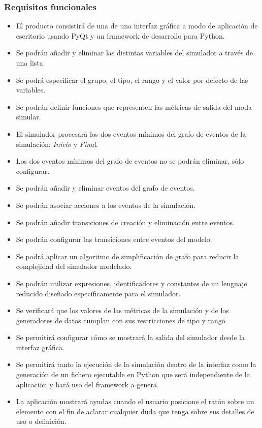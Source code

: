 \subsubsection{Requisitos funcionales}
\begin{itemize}
    \item El producto consistirá de una de una interfaz gráfica a modo de
    aplicación de escritorio usando PyQt y un framework de desarrollo para
    Python.
    \item Se podrán añadir y eliminar las distintas variables del
    simulador a través de una lista.
    \item Se podrá especificar el grupo, el tipo, el rango y el valor por
    defecto de las variables.
    \item Se podrán definir funciones que representen las métricas de salida del
    moda simular.
    \item El simulador procesará los dos eventos mínimos del grafo de eventos de
    la simulación: \emph{Inicio} y \emph{Final}.
    \item Los dos eventos mínimos del grafo de eventos no se podrán eliminar,
    sólo configurar.
    \item Se podrán añadir y eliminar eventos del grafo de eventos.
    \item Se podrán asociar acciones a los eventos de la simulación.
    \item Se podrán añadir transiciones de creación y eliminación entre eventos.
    \item Se podrán configurar las transiciones entre eventos del modelo.
    \item Se podrá aplicar un algoritmo de simplificación de grafo para reducir
    la complejidad del simulador modelado.
    \item Se podrán utilizar expresiones, identificadores y constantes de un
    lenguaje reducido diseñado específicamente para el simulador.
    \item Se verificará que los valores de las métricas de la simulación y de
    los generadores de datos cumplan con sus restricciones de tipo y rango.
    \item Se permitirá configurar cómo se mostrará la salida del simulador desde
    la interfaz gráfica.
    \item Se permitirá tanto la ejecución de la simulación dentro de la interfaz como la
    generación de un fichero ejecutable en Python que será independiente de la
    aplicación y hará uso del framework a genera.
    \item La aplicación mostrará ayudas cuando el usuario posicione el ratón
    sobre un elemento con el fin de aclarar cualquier duda que tenga sobre sus
    detalles de uso o definición.
\end{itemize}
